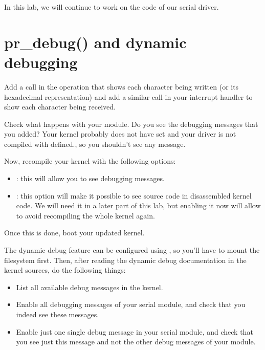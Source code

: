 
In this lab, we will continue to work on the code of our serial driver.

\section{pr\_debug() and dynamic debugging}

Add a  call in the  operation that shows
each character being written (or its hexadecimal representation) and
add a similar  call in your interrupt handler to show
each character being received.

Check what happens with your module. Do you see the debugging messages
that you added? Your kernel probably does not have
 set and your driver is not compiled with
 defined., so you shouldn't see any message.

Now, recompile your kernel with the following options:

\begin{itemize}
\item {}: this will allow you to see
  debugging messages.
\item {}: this option will make it
  possible to see source code in disassembled kernel code.
  We will need it in a later part of this lab, but enabling
  it now will allow to avoid recompiling the whole kernel again.
\end{itemize}

Once this is done, boot your updated kernel.

The dynamic debug feature can be configured using , so you'll have
to mount the  filesystem first. Then, after reading the dynamic
debug documentation in the kernel sources, do the following things:

\begin{itemize}

\item List all available debug messages in the kernel.

\item Enable all debugging messages of your serial module, and check
  that you indeed see these messages.

\item Enable just one single debug message in your serial module, and
  check that you see just this message and not the other debug
  messages of your module.

\end{itemize}

